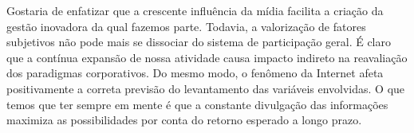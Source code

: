 \documentclass[a4paper, 12pt]{article}
\begin{document}
Gostaria de enfatizar que a crescente influência da mídia facilita a criação da gestão inovadora da qual fazemos parte. Todavia, a valorização de fatores subjetivos não pode mais se dissociar do sistema de participação geral. É claro que a contínua expansão de nossa atividade causa impacto indireto na reavaliação dos paradigmas corporativos. Do mesmo modo, o fenômeno da Internet afeta positivamente a correta previsão do levantamento das variáveis envolvidas. O que temos que ter sempre em mente é que a constante divulgação das informações maximiza as possibilidades por conta do retorno esperado a longo prazo.



\newpage
\end{document}
